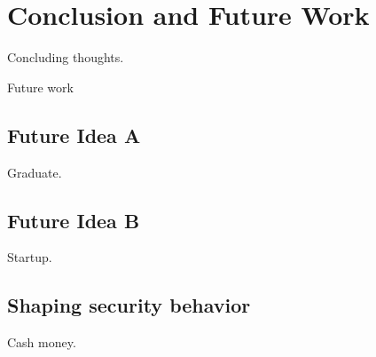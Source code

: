 \chapter{Conclusion and Future Work}

Concluding thoughts.

Future work

\section{Future Idea A}
Graduate.

\section{Future Idea B}
Startup.

\section{Shaping security behavior}
Cash money.





